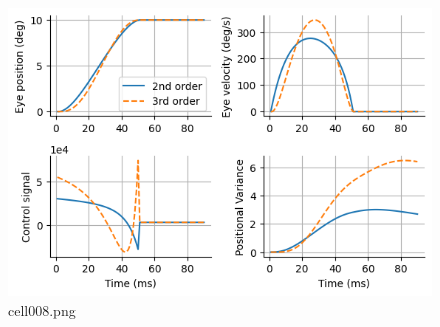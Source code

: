 \begin{figure}[ht]
	\centering
	\includegraphics[scale=0.8, max width=\linewidth]{./fig/motor-learning/minimum-variance/cell008.png}
	\caption{cell008.png}
	\label{cell008.png}
\end{figure}